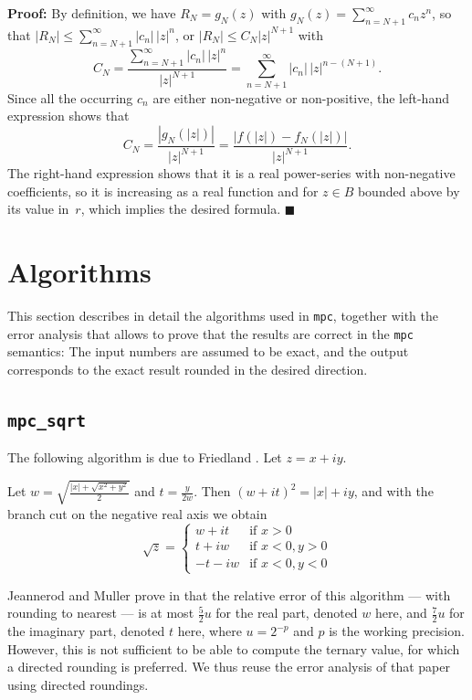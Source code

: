 \documentclass [11pt]{article}
\newcommand {\mpc}{{\tt mpc}}
\renewcommand {\leq}{\leqslant}
\newenvironment{proof}{\noindent \textbf {Proof:}}{{\hspace* {\fill}$\blacksquare$}}
\begin{document}
\begin {proof}
By definition, we have $R_N = g_N (z)$ with
$g_N (z) = \sum_{n = N+1}^\infty c_n z^n$, so that
$|R_N| \leq \sum_{n=N+1}^\infty |c_n| \, |z|^n$,
or
$|R_N| \leq C_N |z|^{N+1}$
with
\[
C_N = \frac {\sum_{n=N+1}^\infty |c_n| \, |z|^n}{|z|^{N+1}}
    = \sum_{n=N+1}^\infty |c_n| \, |z|^{n - (N+1)}.
\]
Since all the occurring $c_n$ are either non-negative or non-positive,
the left-hand expression shows that
\[
C_N = \frac {|g_N (|z|)|}{|z|^{N+1}}
    = \frac {|f (|z|) - f_N (|z|)|}{|z|^{N+1}}.
\]
The right-hand expression shows that it is a real power-series with
non-negative coefficients, so it is increasing as a real function and
for $z \in B$ bounded above by its value in~$r$, which implies the
desired formula.
\end {proof}




\section {Algorithms}
\label {sec:algorithms}

This section describes in detail the algorithms used in \mpc, together with
the error analysis that allows to prove that the results are correct in the
{\mpc} semantics: The input numbers are assumed to be exact, and the output
corresponds to the exact result rounded in the desired direction.


\subsection {\texttt {mpc\_sqrt}}

The following algorithm is due to Friedland \cite{Friedland67,Smith98}.
Let $z = x + i y$.

Let $w = \sqrt { \frac {|x| + \sqrt {x^2 + y^2}}{2}}$ and
$t = \frac {y}{2w}$. Then $(w + it)^2 = |x| + iy$, and with the branch cut on the negative real axis we obtain
\[
\sqrt z = \left\{
\begin {array}{cl}
w + i t & \text {if } x > 0 \\
t + i w & \text {if } x < 0, y > 0 \\
-t - i w & \text {if } x < 0, y < 0
\end {array}
\right.
\]

Jeannerod and Muller prove in \cite{jeannerod:ensl-01780265} that the relative
error of this algorithm --- with rounding to nearest ---
is at most $\frac{5}{2} u$ for the real part, denoted
$w$ here, and
$\frac{7}{2} u$ for the imaginary part, denoted $t$ here,
where $u = 2^{-p}$ and $p$ is the
working precision.
However, this is not sufficient to be able to compute the ternary value,
for which a directed rounding is preferred.
We thus reuse the error analysis of that paper using directed roundings.
\end{document}
